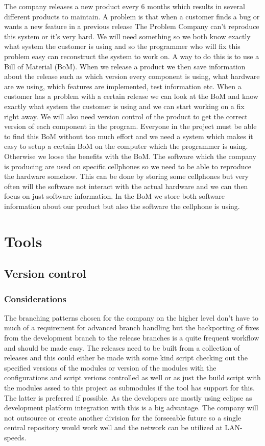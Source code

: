 \documentclass[a4paper,11pt]{article}
\begin{document}
The company releases a new product every 6 months which results in several
different products to maintain. A problem is that when a customer finds a bug or
wants a new feature in a previous release The Problem Company can't reproduce
this system or it's very hard. We will need something so we both know exactly
what system the customer is using and so the programmer who will fix this
problem easy can reconstruct the system to work on. A way to do this is to use a
Bill of Material (BoM). When we release a product we then save information about
the release such as which version every component is using, what hardware are we
using, which features are implemented, test information etc. When a customer has
a problem with a certain release we can look at the BoM and know exactly what
system the customer is using and we can start working on a fix right away. We
will also need version control of the product to get the correct version of each
component in the program. Everyone in the project must be able to find this BoM
without too much effort and we need a system which makes it easy to setup a
certain BoM on the computer which the programmer is using. Otherwise we loose
the benefits with the BoM. The software which the company is producing are used
on specific cellphones so we need to be able to reproduce the hardware somehow.
This can be done by storing some cellphones but very often will the software not
interact with the actual hardware and we can then focus on just
software information. In the BoM we store both software information about our
product but also the software the cellphone is using.


\section{Tools}

\subsection{Version control}


\subsubsection{Considerations}
The branching patterns chosen for the company on the higher level don't have to
much of a requirement for advanced branch handling but the backporting of fixes
from the development branch to the release branches is a quite frequent
workflow and should be made easy. The releases need to be built from a
collection of releases and this could either be made with some kind script
checking out the specified versions of the modules or version of the modules
with the configurations and script verions controlled as well or as just the
build script with the modules assed to this project as submodules if the tool
has support for this. The latter is preferred if possible. As the developers
are mostly using eclipse as development platform integration with this is a big
advantage. The company will not outsource or create another division for the
forseeable future so a single central repository would work well and the
network can be utilized at LAN-speeds.
\end{document}

